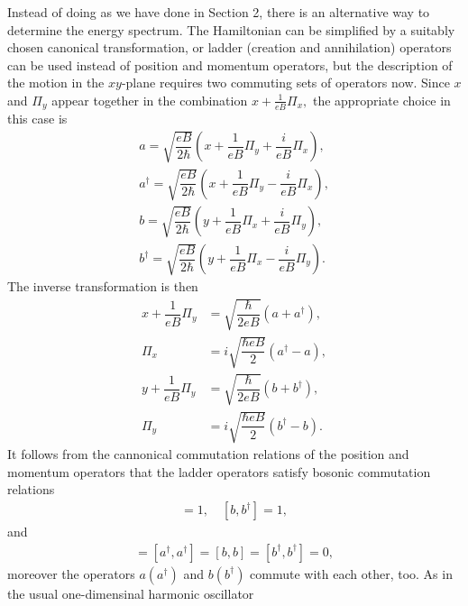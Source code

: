 \documentclass{report}
\newcommand{\f}[2]{\dfrac{#1}{#2}}
\begin{document}
Instead of doing as we have done in Section 2, there is an alternative way to determine the energy spectrum. The Hamiltonian can be simplified by a suitably chosen canonical transformation, or ladder (creation and annihilation) operators can be used instead of position and momentum operators, but the description of the motion in the $xy$-plane requires two commuting sets of operators now. Since $x$ and $\Pi_{y}$ appear together in the combination $x + \frac{1}{eB} \Pi_{x},$
the appropriate choice in this case is  \cite{solyom2008fundamentals,griffiths2018introduction}
\begin{equation}
	\begin{aligned}
		a = \sqrt{\f{eB}{2\hbar}} \left(x + \f{1}{eB} \Pi_{y} + \f{i}{eB} \Pi_{x}\right),           \\
		a^{\dagger} = \sqrt{\f{eB}{2\hbar}} \left(x + \f{1}{eB} \Pi_{y} - \f{i}{eB} \Pi_{x}\right), \\
		b = \sqrt{\f{eB}{2\hbar}} \left(y + \f{1}{eB} \Pi_{x} + \f{i}{eB} \Pi_{y}\right),           \\
		b^{\dagger} = \sqrt{\f{eB}{2\hbar}} \left(y + \f{1}{eB} \Pi_{x} - \f{i}{eB} \Pi_{y}\right).
	\end{aligned}
\end{equation}
The inverse transformation is then
\begin{equation}
	\begin{aligned}
		x + \f{1}{eB} \Pi_{y} & = \sqrt{\f{\hbar}{2eB}} \left(a + a^{\dagger}\right) ,    \\
		\Pi_{x}               & = i \sqrt{\f{\hbar eB}{2}} \left(a^{\dagger} - a\right) , \\
		y + \f{1}{eB} \Pi_{y} & = \sqrt{\f{\hbar}{2eB}} \left(b + b^{\dagger}\right) ,    \\
		\Pi_{y}               & = i \sqrt{\f{\hbar eB}{2}} \left(b^{\dagger} - b\right).
	\end{aligned}
\end{equation}
It follows from the cannonical commutation relations of the position and momentum operators that the ladder operators satisfy bosonic commutation relations
\begin{gather}
	[a,a^{\dagger}] = 1, \quad [b,b^{\dagger}] = 1,
\end{gather}
and
\begin{gather}
	[a,a] = [a^{\dagger},a^{\dagger}] = [b,b] = [b^{\dagger},b^{\dagger}] = 0,
\end{gather}
moreover the operators $a (a^{\dagger})$ and $b (b^{\dagger})$ commute with each other, too. As in the usual one-dimensinal harmonic oscillator
\end{document}
